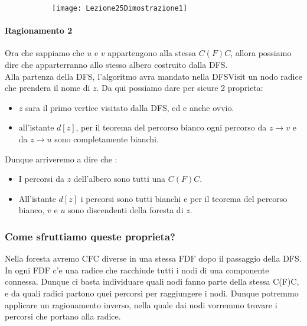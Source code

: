 \begin{figure}[H]
	\centering
	\begin{subfigure}[b]{0.30\textwidth}
		\texttt{[image: Lezione25Dimostrazione1]} 
	\end{subfigure}
\end{figure}


\paragraph{Ragionamento 2}Ora che sappiamo che $u$ e $v$ appartengono alla stessa $C(F)C$, allora possiamo dire che apparterranno allo stesso albero costruito dalla DFS.\\
	
Alla partenza della DFS, l'algoritmo avra mandato nella DFSVisit un nodo radice che prendera il nome di $z$.
Da qui possiamo dare per sicure 2 proprieta:
\begin{itemize}
	\item $z$ sara il primo vertice visitato dalla DFS, ed e anche ovvio.
	\item all'istante $d[z]$, per il teorema del percorso bianco ogni percorso da $z \rightarrow v$ e da $z \rightarrow u$ sono completamente bianchi.
\end{itemize}

	 Dunque arriveremo a dire che :
\begin{itemize}
	 \item I percorsi da $z$ dell'albero sono tutti una $C(F)C$.
	 \item All'istante $d[z]$ i percorsi sono tutti bianchi e per il teorema del percorso bianco, $v$ e $u$ sono discendenti della foresta di $z$.
\end{itemize}

\subsubsection{Come sfruttiamo queste proprieta?}
Nella foresta avremo CFC diverse in una stessa FDF dopo il passaggio della DFS. In ogni FDF c'e una radice che racchiude tutti i nodi di una componente connessa.
Dunque ci basta individuare quali nodi fanno parte della stessa C(F)C, e da quali radici partono quei percorsi per raggiungere i nodi. Dunque potremmo applicare un ragionamento inverso, nella quale dai nodi vorremmo trovare i percorsi che portano alla radice.


